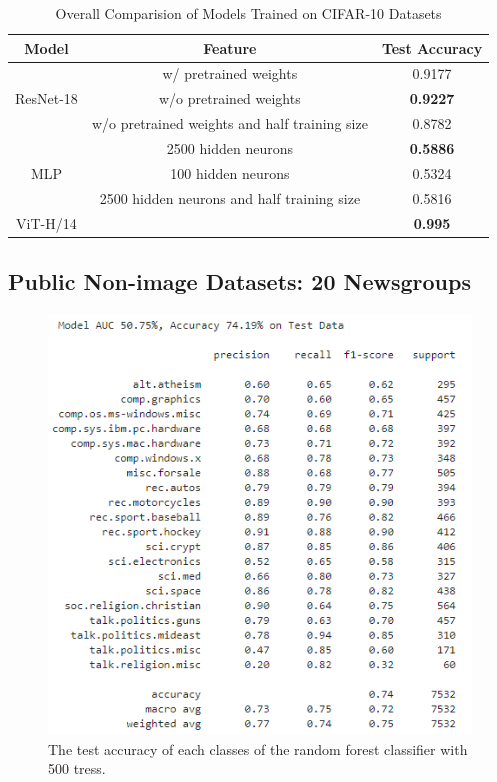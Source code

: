 \documentclass[twocolumn]{extarticle}
\begin{document}
\begin{appendices}
\begin{table}[h]
\centering
\caption{Overall Comparision of Models Trained on CIFAR-10 Datasets}
\label{tab:cifar-comp}
\begin{tabular}{@{}ccc@{}}
Model                      & Feature                                       & Test Accuracy   \\ \midrule
\multirow{3}{*}{ResNet-18} & w/ pretrained weights                         & 0.9177          \\
                           & w/o pretrained weights                        & \textbf{0.9227} \\
                           & w/o pretrained weights and half training size & 0.8782          \\ \midrule
\multirow{3}{*}{MLP}       & 2500 hidden neurons                           & \textbf{0.5886} \\
                           & 100 hidden neurons                            & 0.5324          \\
                           & 2500 hidden neurons and half training size    & 0.5816          \\ \midrule
ViT-H/14                   &                                               & \textbf{0.995} 
\end{tabular}
\end{table}

\subsection{Public Non-image Datasets: 20 Newsgroups}

\begin{figure}[H]
\centering
\includegraphics[width=0.9\linewidth]{charts/random-forest-500-acc}
\caption{The test accuracy of each classes of the random forest classifier with 500 tress.}
\label{chart:random-forest-500-acc}
\end{figure}


\end{appendices}
\end{document}
